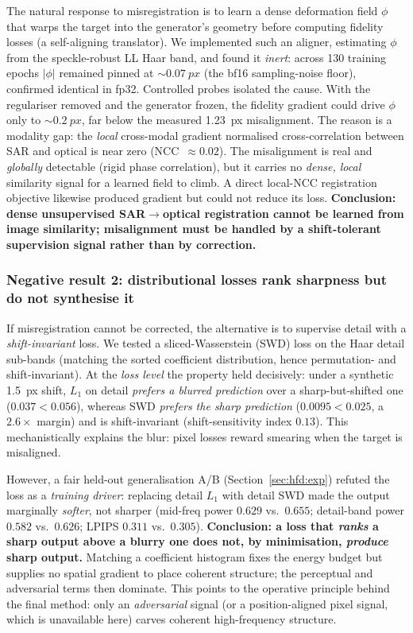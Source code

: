 The natural response to misregistration is to learn a dense deformation field $\phi$ that warps
the target into the generator's geometry before computing fidelity losses (a self-aligning
translator). We implemented such an aligner, estimating $\phi$ from the speckle-robust LL Haar
band, and found it \emph{inert}: across \num{130} training epochs $\lvert\phi\rvert$ remained
pinned at ${\sim}\SI{0.07}{px}$ (the bf16 sampling-noise floor), confirmed identical in fp32.
Controlled probes isolated the cause. With the regulariser removed and the generator frozen,
the fidelity gradient could drive $\phi$ only to ${\sim}\SI{0.2}{px}$, far below the measured
\SI{1.23}{px} misalignment. The reason is a modality gap: the \emph{local} cross-modal
gradient normalised cross-correlation between SAR and optical is near zero
(NCC~${\approx}0.02$). The misalignment is real and \emph{globally} detectable (rigid phase
correlation), but it carries no \emph{dense, local} similarity signal for a learned field to
climb. A direct local-NCC registration objective likewise produced gradient but could not
reduce its loss. \textbf{Conclusion: dense unsupervised SAR$\to$optical registration cannot be
learned from image similarity; misalignment must be handled by a shift-tolerant supervision
signal rather than by correction.}

\subsubsection{Negative result 2: distributional losses rank sharpness but do not synthesise it}
\label{sec:hfd:neg2}

If misregistration cannot be corrected, the alternative is to supervise detail with a
\emph{shift-invariant} loss. We tested a sliced-Wasserstein (SWD) loss on the Haar detail
sub-bands (matching the sorted coefficient distribution, hence permutation- and
shift-invariant). At the \emph{loss level} the property held decisively: under a synthetic
\SI{1.5}{px} shift, $L_1$ on detail \emph{prefers a blurred prediction} over a
sharp-but-shifted one ($0.037 < 0.056$), whereas SWD \emph{prefers the sharp prediction}
($0.0095 < 0.025$, a $2.6\times$ margin) and is shift-invariant (shift-sensitivity index
$0.13$). This mechanistically explains the blur: pixel losses reward smearing when the target
is misaligned.

However, a fair held-out generalisation A/B (Section~\ref{sec:hfd:exp}) refuted the loss as a
\emph{training driver}: replacing detail $L_1$ with detail SWD made the output marginally
\emph{softer}, not sharper (mid-freq power $0.629$ vs.\ $0.655$; detail-band power $0.582$ vs.\
$0.626$; LPIPS $0.311$ vs.\ $0.305$). \textbf{Conclusion: a loss that \emph{ranks} a sharp
output above a blurry one does not, by minimisation, \emph{produce} sharp output.} Matching a
coefficient histogram fixes the energy budget but supplies no spatial gradient to place
coherent structure; the perceptual and adversarial terms then dominate. This points to the
operative principle behind the final method: only an \emph{adversarial} signal (or a
position-aligned pixel signal, which is unavailable here) carves coherent high-frequency
structure.


